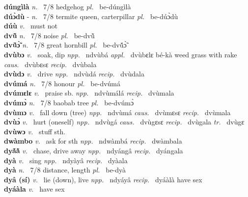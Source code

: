 {\bfseries dúngìlà}  {\itshape n.~} 7/8 hedgehog {\itshape pl.~} be-dúngìlà    \\ 
{\bfseries dúɔ̀dù} - {\itshape n.~} 7/8 termite queen, carterpillar {\itshape pl.~} be-dúɔ̀dù    \\ 
{\bfseries dúù}  {\itshape v.~} must not    \\ 
{\bfseries dvũ̌}  {\itshape n.~} 7/8 noise {\itshape pl.~} be-dvũ̌    \\ 
{\bfseries dvṹɔ̃̀}  {\itshape n.~} 7/8 great hornbill {\itshape pl.~} be-dvṹɔ̃̀    \\ 
{\bfseries dvùbɔ}  {\itshape v.~} soak, dip   {\itshape npp.~} ndvùbá {\itshape appl.~} dvùbɛlɛ bé-kà weed grass with rake {\itshape caus.~} dvùbɛsɛ {\itshape recip.~} dvùbala  \\ 
{\bfseries dvùdɔ}  {\itshape v.~} drive   {\itshape npp.~} ndvùdá {\itshape recip.~} dvùdala  \\ 
{\bfseries dvúmá}  {\itshape n.~} 7/8 honour {\itshape pl.~} be-dvúmá    \\ 
{\bfseries dvúmɛlɛ}  {\itshape v.~} praise sb.   {\itshape npp.~} ndvùmálá {\itshape recip.~} dvùmala  \\ 
{\bfseries dvúmɔ̀}  {\itshape n.~} 7/8 baobab tree {\itshape pl.~} be-dvúmɔ̀    \\ 
{\bfseries dvùmɔ}  {\itshape v.~} fall down (tree)   {\itshape npp.~} ndvùmá {\itshape caus.~} dvùmɛsɛ {\itshape recip.~} dvùmala  \\ 
{\bfseries dvùɔ̀}  {\itshape v.~} hurt (oneself)   {\itshape npp.~} ndvùgá {\itshape caus.~} dvùgɛsɛ {\itshape recip.~} dvùgala {\itshape tr.~} dvùgɛ \\ 
{\bfseries dvùwɔ}  {\itshape v.~} stuff sth.    \\ 
{\bfseries dwàmbo}  {\itshape v.~} ask for sth   {\itshape npp.~} ndwàmbá {\itshape recip.~} dwàmbala  \\ 
{\bfseries dyã́ã̀}  {\itshape v.~} chase, drive away   {\itshape npp.~} ndyángâ {\itshape recip.~} dyángala\\ 
{\bfseries dyà}  {\itshape v.~} sing   {\itshape npp.~} ndyàyâ {\itshape recip.~} dyàala  \\ 
{\bfseries dyà}  {\itshape n.~} 7/8 distance, length {\itshape pl.~} be-dyà    \\ 
{\bfseries dyâ (sí)}  {\itshape v.~} lie (down), live   {\itshape npp.~} ndyáyâ {\itshape recip.~} dyáàlà have sex  \\ 
{\bfseries dyáàla}  {\itshape v.~} have sex    \\ 
